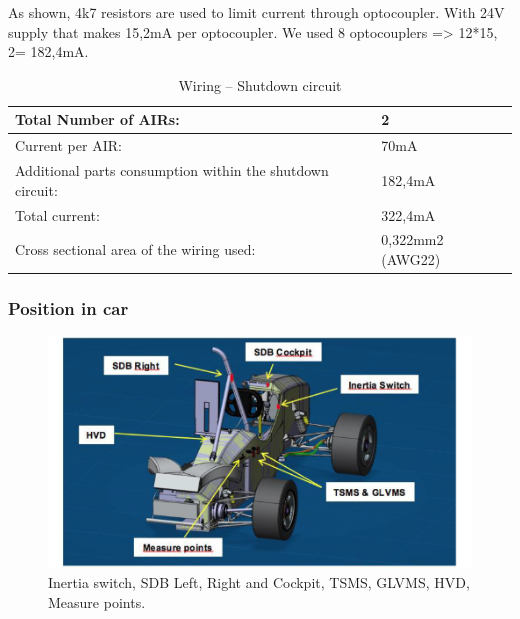 As shown, 4k7 resistors are used to limit current through optocoupler. With 24V supply that makes 15,2mA per optocoupler. We used 8 optocouplers => 12*15, 2= 182,4mA.
\begin{table}[H]
	\centering
	\caption{Wiring – Shutdown circuit}
	\begin{tabularx}{\textwidth}{|X|X|}
		\hline
		Total Number of AIRs: & 2 \\[\TableSize]
		\hline
		Current per AIR: & 70mA \\[\TableSize]
		\hline
		Additional parts consumption within the shutdown circuit: & 182,4mA \\[\TableSize]
		\hline
		Total current: & 322,4mA \\[\TableSize]
		\hline
		Cross sectional area of the wiring used: & 0,322mm2 (AWG22) \\[\TableSize]
		\hline
	\end{tabularx}%
	\label{tab:SDC-Wiring}%
\end{table}%


\subsubsection{Position in car}

\begin{figure}[H]
	\includegraphics[width=\textwidth]{./img/SDC-positionInCar.png}
	\caption{Inertia switch, SDB Left, Right and Cockpit, TSMS, GLVMS, HVD, Measure points.}
	\label{fig:SDC-positionInCar}
\end{figure}